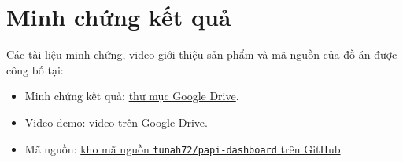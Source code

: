\section{Minh chứng kết quả}
\label{appendix:evidence}

Các tài liệu minh chứng, video giới thiệu sản phẩm và mã nguồn của đồ án được công bố tại:

\begin{itemize}
    \setlength{\itemsep}{0.2em}
    \setlength{\parskip}{0pt}
    \item Minh chứng kết quả: \href{https://drive.google.com/drive/folders/1EJoYErH-xulCpA_Sxmi9DxXkS5oMcfq9?usp=sharing}{thư mục Google Drive}.
    \item Video demo: \href{https://drive.google.com/file/d/1OIrdref8werXjB4FZUlOxp96OkxdJQKn/view?usp=sharing}{video trên Google Drive}.
    \item Mã nguồn: \href{https://github.com/tunah72/papi-dashboard}{kho mã nguồn \texttt{tunah72/papi-dashboard} trên GitHub}.
\end{itemize}
